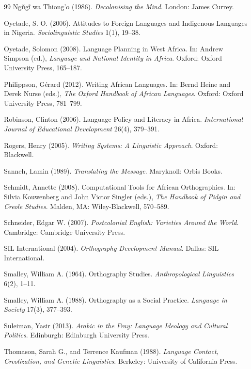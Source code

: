 \documentclass[12pt]{article}
\begin{document}
\begin{thebibliography}{99}
Ngũgĩ wa Thiong'o (1986).
\textit{Decolonising the Mind}.
London: James Currey.

Oyetade, S. O. (2006).
Attitudes to Foreign Languages and Indigenous Languages in Nigeria.
\textit{Sociolinguistic Studies} 1(1), 19--38.

Oyetade, Solomon (2008).
Language Planning in West Africa.
In: Andrew Simpson (ed.),
\textit{Language and National Identity in Africa}.
Oxford: Oxford University Press, 165--187.

Philippson, Gérard (2012).
Writing African Languages.
In: Bernd Heine and Derek Nurse (eds.),
\textit{The Oxford Handbook of African Languages}.
Oxford: Oxford University Press, 781--799.

Robinson, Clinton (2006).
Language Policy and Literacy in Africa.
\textit{International Journal of Educational Development} 26(4), 379--391.

Rogers, Henry (2005).
\textit{Writing Systems: A Linguistic Approach}.
Oxford: Blackwell.

Sanneh, Lamin (1989).
\textit{Translating the Message}.
Maryknoll: Orbis Books.

Schmidt, Annette (2008).
Computational Tools for African Orthographies.
In: Silvia Kouwenberg and John Victor Singler (eds.),
\textit{The Handbook of Pidgin and Creole Studies}.
Malden, MA: Wiley-Blackwell, 570--589.

Schneider, Edgar W. (2007).
\textit{Postcolonial English: Varieties Around the World}.
Cambridge: Cambridge University Press.

SIL International (2004).
\textit{Orthography Development Manual}.
Dallas: SIL International.

Smalley, William A. (1964).
Orthography Studies.
\textit{Anthropological Linguistics} 6(2), 1--11.

Smalley, William A. (1988).
Orthography as a Social Practice.
\textit{Language in Society} 17(3), 377--393.

Suleiman, Yasir (2013).
\textit{Arabic in the Fray: Language Ideology and Cultural Politics}.
Edinburgh: Edinburgh University Press.

Thomason, Sarah G., and Terrence Kaufman (1988).
\textit{Language Contact, Creolization, and Genetic Linguistics}.
Berkeley: University of California Press.


\end{thebibliography}
\end{document}
